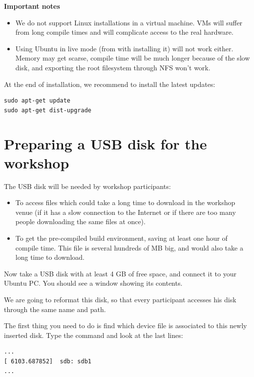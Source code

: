 {\bf Important notes}
\begin{itemize}
\item We do not support Linux installations in a virtual machine.
      VMs will suffer from long compile times and will complicate
      access to the real hardware.
\item Using Ubuntu in live mode (from with installing it) will not work
      either.  Memory may get scarse, compile time will be much longer because
      of the slow disk, and exporting the root filesystem through NFS
      won't work. 
\end{itemize}

At the end of installation, we recommend to install the latest updates:

\begin{verbatim}
sudo apt-get update
sudo apt-get dist-upgrade
\end{verbatim}

\section{Preparing a USB disk for the workshop}

The USB disk will be needed by workshop participants:

\begin{itemize}
\item To access files which could take a long time to download
      in the workshop venue (if it has a slow connection to the Internet
      or if there are too many people downloading the same files at
      once).
\item To get the pre-compiled build environment, saving at least 
      one hour of compile time. This file is several hundreds of MB big,
      and would also take a long time to download.
\end{itemize}

Now take a USB disk with at least 4 GB of free space, and connect it
to your Ubuntu PC. You should see a window showing its contents.

We are going to reformat this disk, so that every participant
accesses his disk through the same name and path.

The first thing you need to do is find which device file is
associated to this newly inserted disk. Type the  command
and look at the last lines:

\begin{verbatim}
...
[ 6103.687852]  sdb: sdb1
...
\end{verbatim}


